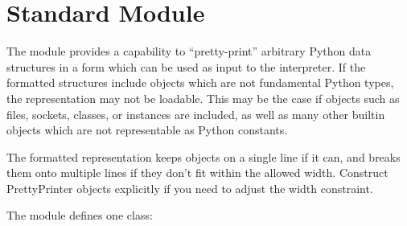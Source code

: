 
\section{Standard Module }
\label{module-pprint}

The  module provides a capability to ``pretty-print''
arbitrary Python data structures in a form which can be used as input
to the interpreter.  If the formatted structures include objects which
are not fundamental Python types, the representation may not be
loadable.  This may be the case if objects such as files, sockets,
classes, or instances are included, as well as many other builtin
objects which are not representable as Python constants.

The formatted representation keeps objects on a single line if it can,
and breaks them onto multiple lines if they don't fit within the
allowed width.  Construct PrettyPrinter objects explicitly if you need
to adjust the width constraint.

The  module defines one class:

\renewcommand{\indexsubitem}{(in module pprint)}


